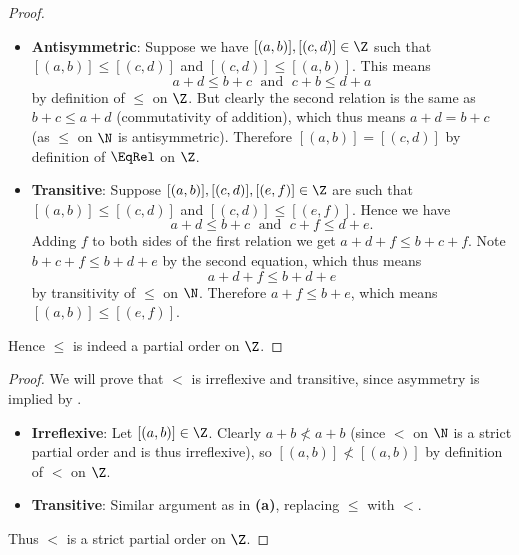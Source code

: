 \begin{questions}
\begin{partquestions}{\alph*}
\begin{proof}
\begin{itemize}
                \item \textbf{Antisymmetric}: Suppose we have $[(a,b)], [(c,d)] \in \Z$ such that $[(a,b)] \leq [(c,d)]$ and $[(c,d)] \leq [(a,b)]$. This means
                \[
                    a + d \leq b + c \;\text{ and }\; c + b \leq d + a
                \]
                by definition of $\leq$ on $\Z$. But clearly the second relation is the same as $b+c \leq a+d$ (commutativity of addition), which thus means $a+d = b+c$ (as $\leq$ on $\N$ is antisymmetric). Therefore $[(a,b)] = [(c,d)]$ by definition of $\EqRel$ on $\Z$.
                
                \item \textbf{Transitive}: Suppose $[(a,b)], [(c,d)], [(e,f)] \in \Z$ are such that $[(a,b)] \leq [(c,d)]$ and $[(c,d)] \leq [(e,f)]$. Hence we have
                \[
                    a + d \leq b + c \;\text{ and }\; c + f \leq d + e.
                \]
                Adding $f$ to both sides of the first relation we get $a + d + f \leq b + c + f$. Note $b + c + f \leq b + d + e$ by the second equation, which thus means
                \[
                    a + d + f \leq b + d + e
                \]
                by transitivity of $\leq$ on $\N$. Therefore $a + f \leq b + e$, which means $[(a, b)] \leq [(e, f)]$.
            \end{itemize}
            Hence $\leq$ is indeed a partial order on $\Z$.
        \end{proof}

        \item \begin{proof}
            We will prove that $<$ is irreflexive and transitive, since asymmetry is implied by .
            \begin{itemize}
                \item \textbf{Irreflexive}: Let $[(a,b)] \in \Z$. Clearly $a + b \not< a + b$ (since $<$ on $\N$ is a strict partial order and is thus irreflexive), so $[(a, b)] \not< [(a, b)]$ by definition of $<$ on $\Z$.
                
                \item \textbf{Transitive}: Similar argument as in \textbf{(a)}, replacing $\leq$ with $<$.
            \end{itemize}
            Thus $<$ is a strict partial order on $\Z$.
        \end{proof}
    \end{partquestions}
\end{questions}
